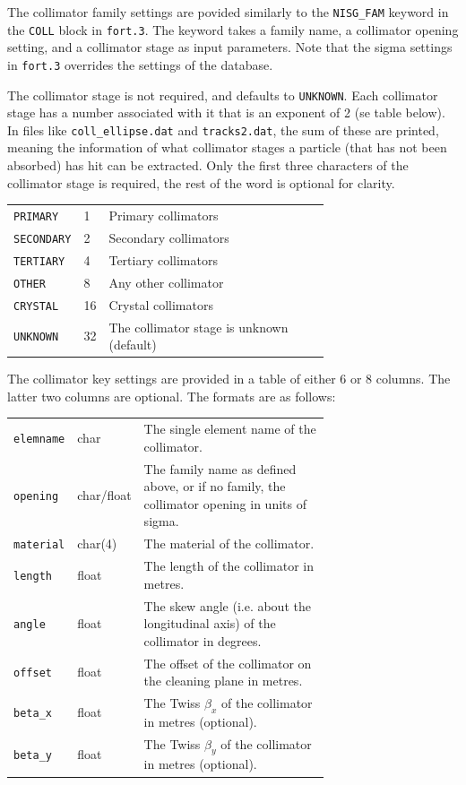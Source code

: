 The collimator family settings are povided similarly to the \texttt{NISG\_FAM} keyword in the \texttt{COLL} block in \texttt{fort.3}.
The keyword takes a family name, a collimator opening setting, and a collimator stage as input parameters.
Note that the sigma settings in \texttt{fort.3} overrides the settings of the database.

The collimator stage is not required, and defaults to \texttt{UNKNOWN}.
Each collimator stage has a number associated with it that is an exponent of 2 (se table below).
In files like \texttt{coll\_ellipse.dat} and \texttt{tracks2.dat}, the sum of these are printed, meaning the information of what collimator stages a particle (that has not been absorbed) has hit can be extracted.
Only the first three characters of the collimator stage is required, the rest of the word is optional for clarity.

\bigskip
\begin{tabular}{@{}llp{0.7\linewidth}}
    \texttt{PRIMARY}   &  1 & Primary collimators \\
    \texttt{SECONDARY} &  2 & Secondary collimators \\
    \texttt{TERTIARY}  &  4 & Tertiary collimators \\
    \texttt{OTHER}     &  8 & Any other collimator \\
    \texttt{CRYSTAL}   & 16 & Crystal collimators \\
    \texttt{UNKNOWN}   & 32 & The collimator stage is unknown (default) \\
\end{tabular}

\bigskip
The collimator key settings are provided in a table of either 6 or 8 columns.
The latter two columns are optional.
The formats are as follows:

\bigskip
\begin{tabular}{@{}llp{0.7\linewidth}}
    \texttt{elemname} & char       & The single element name of the collimator. \\
    \texttt{opening}  & char/float & The family name as defined above, or if no family, the collimator opening in units of sigma. \\
    \texttt{material} & char(4)    & The material of the collimator. \\
    \texttt{length}   & float      & The length of the collimator in metres. \\
    \texttt{angle}    & float      & The skew angle (i.e. about the longitudinal axis) of the collimator in degrees. \\
    \texttt{offset}   & float      & The offset of the collimator on the cleaning plane in metres. \\
    \texttt{beta\_x}  & float      & The Twiss $\beta_x$ of the collimator in metres (optional). \\
    \texttt{beta\_y}  & float      & The Twiss $\beta_y$ of the collimator in metres (optional). \\
\end{tabular}

